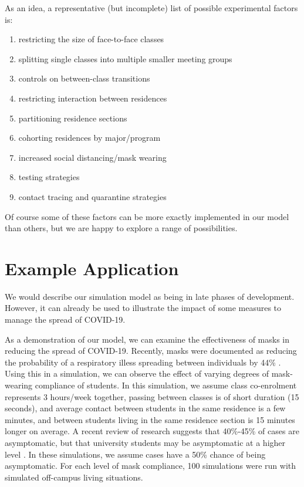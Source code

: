 \documentclass[fleqn,10pt]{SelfArx} %
\begin{document}
As an idea, a representative (but incomplete) list of possible experimental factors is:
\begin{enumerate}
    \setlength{\itemsep}{1pt}
    \setlength{\parskip}{0pt}
    \setlength{\parsep}{0pt}

    \item restricting the size of face-to-face classes

    \item splitting single classes into multiple smaller meeting groups

    \item controls on between-class transitions

    \item restricting interaction between residences

    \item partitioning residence sections

    \item cohorting residences by major/program

    \item increased social distancing/mask wearing

    \item testing strategies

    \item contact tracing and quarantine strategies


\end{enumerate}
Of course some of these factors can be more exactly implemented in our model than others, but we are happy to explore a range of possibilities.




\section{Example Application}
\label{sec:prelimresults}


We would describe our simulation model as being in late phases of development.  However, it can already be used to illustrate the impact of some measures to manage the spread of COVID-19.  

As a demonstration of our model, we can examine the effectiveness of masks in reducing the spread of COVID-19.  
Recently, masks were documented as reducing the probability of a respiratory illess spreading between individuals by 44\%  \cite{chu_physical_2020}.  
Using this in a simulation, we can observe the effect of varying degrees of mask-wearing compliance of students.  
In this simulation, we assume class co-enrolment represents 3 hours/week together, passing between classes is of short duration (15 seconds), and average contact between students in the same residence is a few minutes, and between students living in the same residence section is 15 minutes longer on average.  
A recent review of research suggests that 40\%-45\% of cases are asymptomatic, but that university students may be asymptomatic at a higher level \cite{oran_prevalence_2020}.  
In these simulations, we assume cases have a 50\% chance of being asymptomatic.  
For each level of mask compliance, 100 simulations were run with simulated off-campus living situations.  
\end{document}
